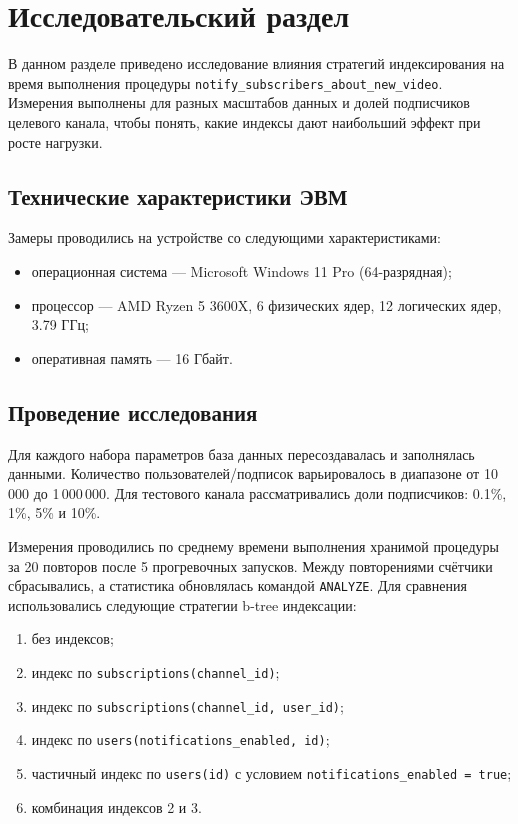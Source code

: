 \chapter{Исследовательский раздел}

В данном разделе приведено исследование влияния стратегий индексирования на время выполнения процедуры \texttt{notify\_subscribers\_about\_new\_video}.
Измерения выполнены для разных масштабов данных и долей подписчиков целевого канала, чтобы понять, какие индексы дают наибольший эффект при росте нагрузки.


\section*{Технические характеристики ЭВМ}
Замеры проводились на устройстве со следующими характеристиками:
\begin{itemize}
    \item операционная система --- Microsoft Windows 11 Pro (64-разрядная);
    \item процессор --- AMD Ryzen 5 3600X, 6 физических ядер, 12 логических ядер, 3.79 ГГц;
    \item оперативная память --- 16 Гбайт.
\end{itemize}


\section{Проведение исследования}
Для каждого набора параметров база данных пересоздавалась и заполнялась данными.
Количество пользователей/подписок варьировалось в диапазоне от 10\,000 до 1\,000\,000.
Для тестового канала рассматривались доли подписчиков: 0.1\%, 1\%, 5\% и 10\%.

Измерения проводились по среднему времени выполнения хранимой процедуры за 20 повторов после 5 прогревочных запусков.
Между повторениями счётчики сбрасывались, а статистика обновлялась командой \texttt{ANALYZE}.
Для сравнения использовались следующие стратегии b-tree индексации:
\begin{enumerate}
    \item без индексов;
    \item индекс по \texttt{subscriptions(channel\_id)};
    \item индекс по \texttt{subscriptions(channel\_id, user\_id)};
    \item индекс по \texttt{users(notifications\_enabled, id)};
    \item частичный индекс по \texttt{users(id)} с условием \texttt{notifications\_enabled = true};
    \item комбинация индексов 2 и 3.
\end{enumerate}

